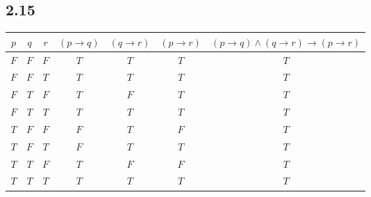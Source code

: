 \documentclass[10pt]{ctexart}
\begin{document}
    \subsection*{2.15}    
    \begin{table}[h]
        \centering
        \begin{tabular}{|c|c|c|c|c|c|c|}
            \hline
            $p$ & $q$ & $r$ & $(p \rightarrow q)$ & $(q \rightarrow r)$ & $(p \rightarrow r)$ & $(p \rightarrow q) \wedge (q \rightarrow r) \rightarrow (p \rightarrow r)$ \\
            \hline
            $F$ & $F$ & $F$ & $T$ & $T$ & $T$ & $T$ \\
            \hline
            $F$ & $F$ & $T$ & $T$ & $T$ & $T$ & $T$ \\
            \hline
            $F$ & $T$ & $F$ & $T$ & $F$ & $T$ & $T$ \\
            \hline
            $F$ & $T$ & $T$ & $T$ & $T$ & $T$ & $T$ \\
            \hline
            $T$ & $F$ & $F$ & $F$ & $T$ & $F$ & $T$ \\
            \hline
            $T$ & $F$ & $T$ & $F$ & $T$ & $T$ & $T$ \\
            \hline
            $T$ & $T$ & $F$ & $T$ & $F$ & $F$ & $T$ \\
            \hline
            $T$ & $T$ & $T$ & $T$ & $T$ & $T$ & $T$ \\
            \hline
        \end{tabular}
    \end{table}
\end{document}

